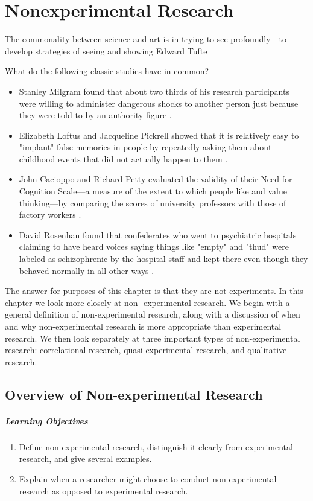 
\chapter{Nonexperimental Research}

The commonality between science and art is in trying to see profoundly - to develop strategies of seeing and showing
Edward Tufte

What do the following classic studies have in common?
\begin{itemize}
\item Stanley Milgram found that about two thirds of his research participants were willing to administer dangerous shocks to another person just because they were told to by an authority figure \citep{milgram_behavioral_1963}.
\item Elizabeth Loftus and Jacqueline Pickrell showed that it is relatively easy to "implant" false memories in people by repeatedly asking them about childhood events that did not actually happen to them \citep{loftus_formation_1995}.
\item John Cacioppo and Richard Petty evaluated the validity of their Need for Cognition Scale---a measure of the extent to which people like and value thinking---by comparing the scores of university professors with those of factory workers \citep{cacioppo_need_1982}.
\item David Rosenhan found that confederates who went to psychiatric hospitals claiming to have heard voices saying things like "empty" and "thud" were labeled as schizophrenic by the hospital staff and kept there even though they behaved normally in all other ways \citep{rosenhan_being_1973}.
\end{itemize}

The answer for purposes of this chapter is that they are not experiments. In this chapter we look more closely at non- experimental research. We begin with a general definition of non-experimental research, along with a discussion of when and why non-experimental research is more appropriate than experimental research. We then look separately at three important types of non-experimental research: correlational research, quasi-experimental research, and qualitative research.

\section{Overview of Non-experimental Research}

 \paragraph{Learning Objectives}
 \begin{enumerate}
 \item Define non-experimental research, distinguish it clearly from experimental research, and give several examples.
 \item Explain when a researcher might choose to conduct non-experimental research as opposed to experimental research.
   \end{enumerate}


